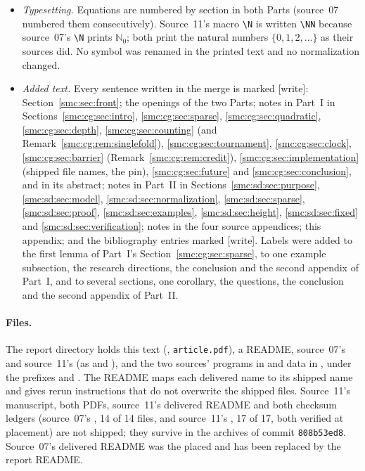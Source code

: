 \documentclass[11pt,letterpaper]{article}
\numberwithin{equation}{section}
\theoremstyle{definition}
\theoremstyle{remark}
\newcommand{\N}{\mathbb N_0}
\newcommand{\NN}{\mathbb N}
\newcommand{\wtag}{\textup{[write]}}
\begin{document}
\begin{itemize}
\item \emph{Typesetting.} Equations are numbered by section in both Parts (source~07 numbered them consecutively). Source~11's macro \verb|\N| is written \verb|\NN| because source~07's \verb|\N| prints $\N$; both print the natural numbers $\{0,1,2,\ldots\}$ as their sources did. No symbol was renamed in the printed text and no normalization changed.
\item \emph{Added text.} Every sentence written in the merge is marked \wtag: Section~\ref{smc:sec:front}; the openings of the two Parts; notes in Part~I in Sections~\ref{smc:cg:sec:intro}, \ref{smc:cg:sec:sparse}, \ref{smc:cg:sec:quadratic}, \ref{smc:cg:sec:depth}, \ref{smc:cg:sec:counting} (and Remark~\ref{smc:cg:rem:singlefold}), \ref{smc:cg:sec:tournament}, \ref{smc:cg:sec:clock}, \ref{smc:cg:sec:barrier} (Remark~\ref{smc:cg:rem:credit}), \ref{smc:cg:sec:implementation} (shipped file names, the pin), \ref{smc:cg:sec:future} and \ref{smc:cg:sec:conclusion}, and in its abstract; notes in Part~II in Sections~\ref{smc:sd:sec:purpose}, \ref{smc:sd:sec:model}, \ref{smc:sd:sec:normalization}, \ref{smc:sd:sec:sparse}, \ref{smc:sd:sec:proof}, \ref{smc:sd:sec:examples}, \ref{smc:sd:sec:height}, \ref{smc:sd:sec:fixed} and \ref{smc:sd:sec:verification}; notes in the four source appendices; this appendix; and the bibliography entries marked \wtag. Labels were added to the first lemma of Part~I's Section~\ref{smc:cg:sec:sparse}, to one example subsection, the research directions, the conclusion and the second appendix of Part~I, and to several sections, one corollary, the questions, the conclusion and the second appendix of Part~II.
\end{itemize}

\paragraph{Files.} The report directory holds this text (, \texttt{article.pdf}), a README, source~07's  and source~11's  (as  and ), and the two sources' programs in  and data in , under the prefixes  and . The README maps each delivered name to its shipped name and gives rerun instructions that do not overwrite the shipped files. Source~11's manuscript, both PDFs, source~11's delivered README and both checksum ledgers (source~07's , 14 of 14 files, and source~11's , 17 of 17, both verified at placement) are not shipped; they survive in the archives of commit \texttt{808b53ed8}. Source~07's delivered README was the placed  and has been replaced by the report README.
\end{document}
